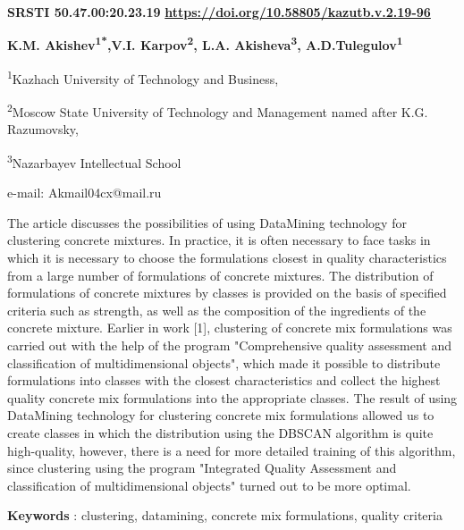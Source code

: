 \clearpage
{\bfseries SRSTI 50.47.00:20.23.19}\hfill
\hfill {\bfseries \href{https://doi.org/10.58805/kazutb.v.2.19-96}{https://doi.org/10.58805/kazutb.v.2.19-96}}


\begin{center}
{\bfseries K.M. Akishev\textsuperscript{1*},V.I. Karpov\textsuperscript{2},
L.A. Akisheva\textsuperscript{3}, A.D.Tulegulov\textsuperscript{1}}

\textsuperscript{1}Kazhach University of Technology and
Business,

\textsuperscript{2}Moscow State University of Technology and
Management named after K.G. Razumovsky,

\textsuperscript{3}Nazarbayev
Intellectual School

e-mail: Akmail04cx@mail.ru
\end{center}

The article discusses the possibilities of using DataMining technology
for clustering concrete mixtures. In practice, it is often necessary to
face tasks in which it is necessary to choose the formulations closest
in quality characteristics from a large number of formulations of
concrete mixtures. The distribution of formulations of concrete mixtures
by classes is provided on the basis of specified criteria such as
strength, as well as the composition of the ingredients of the concrete
mixture. Earlier in work {[}1{]}, clustering of concrete mix
formulations was carried out with the help of the program "Comprehensive
quality assessment and classification of multidimensional objects",
which made it possible to distribute formulations into classes with the
closest characteristics and collect the highest quality concrete mix
formulations into the appropriate classes. The result of using
DataMining technology for clustering concrete mix formulations allowed
us to create classes in which the distribution using the DBSCAN
algorithm is quite high-quality, however, there is a need for more
detailed training of this algorithm, since clustering using the program
"Integrated Quality Assessment and classification of multidimensional
objects" turned out to be more optimal.

{\bfseries Keywords} : clustering, datamining, concrete mix formulations,
quality criteria


